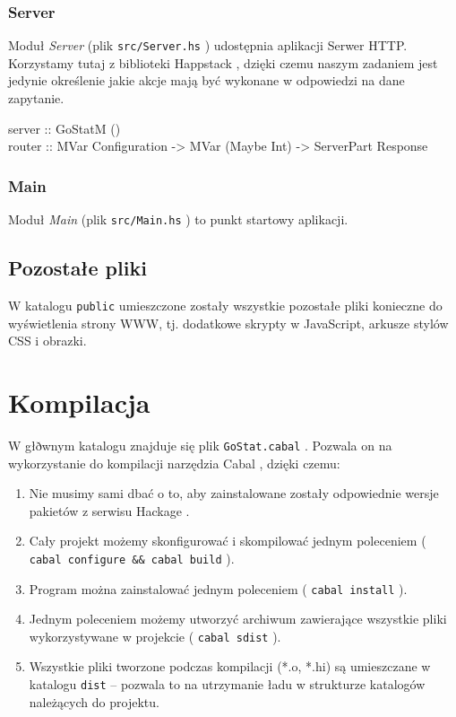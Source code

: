 \documentclass[10pt,leqno]{article}
\newcommand{\cmd}[1]{
  \texttt{#1}
}
\begin{document}
\subsubsection{Server}
Moduł \emph{Server} (plik \cmd{src/Server.hs}) udostępnia aplikacji Serwer HTTP.
Korzystamy tutaj z biblioteki Happstack \cite{happstack}, dzięki czemu naszym zadaniem
jest jedynie określenie jakie akcje mają być wykonane w odpowiedzi na dane zapytanie.

\begin{framed}
\noindent server :: GoStatM () \\
router :: MVar Configuration -> MVar (Maybe Int) -> ServerPart Response
\end{framed}

\subsubsection{Main}
Moduł \emph{Main} (plik \cmd{src/Main.hs}) to punkt startowy aplikacji.

\subsection{Pozostałe pliki}
W katalogu \cmd{public} umieszczone zostały wszystkie pozostałe pliki konieczne do
wyświetlenia strony WWW, tj. dodatkowe skrypty w JavaScript, arkusze stylów CSS i obrazki.

\newpage

\section{Kompilacja}

W głðwnym katalogu znajduje się plik \cmd{GoStat.cabal}. Pozwala on na wykorzystanie do kompilacji 
narzędzia Cabal \cite{cabal}, dzięki czemu:

\begin{enumerate}
\item Nie musimy sami dbać o to, aby zainstalowane zostały odpowiednie wersje pakietów z serwisu
  Hackage \cite{hackage}.
\item Cały projekt możemy skonfigurować i skompilować jednym poleceniem (\cmd{cabal configure \&\& cabal build}).
\item Program można zainstalować jednym poleceniem (\cmd{cabal install}).
\item Jednym poleceniem możemy utworzyć archiwum zawierające wszystkie pliki wykorzystywane w projekcie (\cmd{cabal sdist}).
\item Wszystkie pliki tworzone podczas kompilacji (*.o, *.hi) są umieszczane w katalogu \cmd{dist} -- pozwala
  to na utrzymanie ładu w strukturze katalogów należących do projektu.
\end{enumerate}
\end{document}
